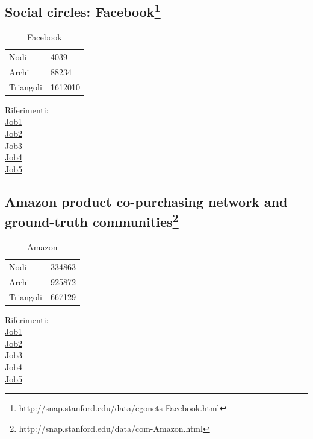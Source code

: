 \documentclass[paper=a4, fontsize=11pt]{scrartcl}	%
\numberwithin{equation}{section}															%
\numberwithin{figure}{section}																%
\numberwithin{table}{section}																%
\begin{document}
\subsection{Social circles: Facebook\protect\footnote{http://snap.stanford.edu/data/egonets-Facebook.html}} 
\protect\begin{table}[]
	\centering
	\caption{Facebook}
	\label{my-label}
	\begin{tabular}{ll}
		Nodi		 & 4039 \\
		Archi		 & 88234 \\
		Triangoli	& 1612010 \\
	\end{tabular}
\end{table}
Riferimenti:\\	
\href{http://hadoop-compute0.di.univr.it:50030/jobdetails.jsp?jobid=job_201603141010_12286}{Job1}\\
\href{http://hadoop-compute0.di.univr.it:50030/jobdetails.jsp?jobid=job_201603141010_12287}{Job2}\\
\href{http://hadoop-compute0.di.univr.it:50030/jobdetails.jsp?jobid=job_201603141010_12288}{Job3}\\
\href{http://hadoop-compute0.di.univr.it:50030/jobdetails.jsp?jobid=job_201603141010_12289}{Job4}\\
\href{http://hadoop-compute0.di.univr.it:50030/jobdetails.jsp?jobid=job_201603141010_12290}{Job5}\\

\subsection{Amazon product co-purchasing network and ground-truth communities\protect\footnote{http://snap.stanford.edu/data/com-Amazon.html}} 
\protect\begin{table}[]
	\centering
	\caption{Amazon}
	\label{my-label}
	\begin{tabular}{ll}
		Nodi		 & 334863 \\
		Archi		 & 925872 \\
		Triangoli	& 667129 \\
	\end{tabular}
\end{table}
Riferimenti:\\	
\href{http://hadoop-compute0.di.univr.it:50030/jobdetails.jsp?jobid=job_201603141010_12271}{Job1}\\
\href{http://hadoop-compute0.di.univr.it:50030/jobdetails.jsp?jobid=job_201603141010_12272}{Job2}\\
\href{http://hadoop-compute0.di.univr.it:50030/jobdetails.jsp?jobid=job_201603141010_12273}{Job3}\\
\href{http://hadoop-compute0.di.univr.it:50030/jobdetails.jsp?jobid=job_201603141010_12274}{Job4}\\
\href{http://hadoop-compute0.di.univr.it:50030/jobdetails.jsp?jobid=job_201603141010_12275}{Job5}\\
\end{document}
